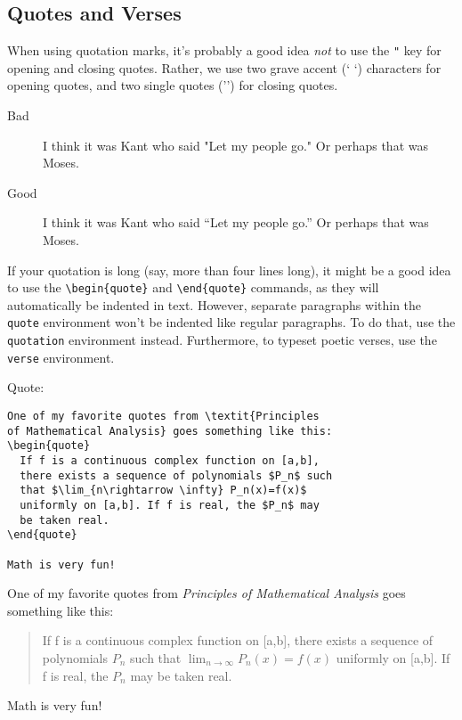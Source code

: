 \subsection{Quotes and Verses}
\label{sec:quotes-verses}

When using quotation marks, it's probably a good idea \emph{not} to
use the \texttt{"} key for opening and closing quotes.  Rather, we use
two grave accent (` \!\!`) characters for opening quotes, and two
single quotes ('') for closing quotes.
\begin{description}
\item[Bad] I think it was Kant who said "Let my people go."  Or
  perhaps that was Moses.
\item[Good] I think it was Kant who said ``Let my people go.''  Or
  perhaps that was Moses.
\end{description}
If your quotation is long (say, more than four lines long), it might
be a good idea to use the \verb=\begin{quote}= and \verb=\end{quote}=
commands, as they will automatically be indented in text.  However,
separate paragraphs within the \texttt{quote} environment won't be
indented like regular paragraphs.  To do that, use the
\texttt{quotation} environment instead.  Furthermore, to typeset
poetic verses, use the \texttt{verse} environment.
\begin{framed}
  \noindent Quote:
\begin{verbatim}
One of my favorite quotes from \textit{Principles
of Mathematical Analysis} goes something like this:
\begin{quote}
  If f is a continuous complex function on [a,b],
  there exists a sequence of polynomials $P_n$ such
  that $\lim_{n\rightarrow \infty} P_n(x)=f(x)$
  uniformly on [a,b]. If f is real, the $P_n$ may
  be taken real.
\end{quote}

Math is very fun!
\end{verbatim}
  One of my favorite quotes from \textit{Principles of Mathematical
    Analysis} goes something like this:
  \begin{quote}
    If f is a continuous complex function on [a,b], there exists a
    sequence of polynomials $P_n$ such that $\lim_{n\rightarrow\infty}
    P_n(x)=f(x)$ uniformly on [a,b]. If f is real, the $P_n$ may be
    taken real.
  \end{quote}

  Math is very fun!
\end{framed}

